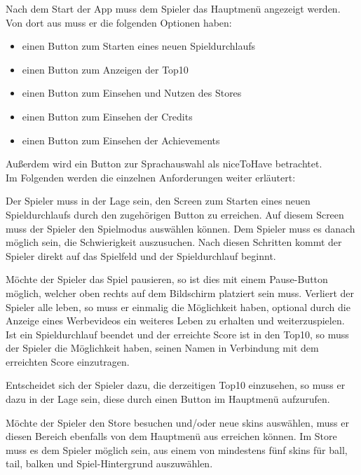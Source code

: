 Nach dem Start der App \gls{muss} dem Spieler das Hauptmenü angezeigt werden.
Von dort aus \gls{muss} er die folgenden Optionen haben:
\begin{itemize}
    \item einen Button zum Starten eines neuen Spieldurchlaufs
    \item einen Button zum Anzeigen der \gls{Top10}
    \item einen Button zum Einsehen und Nutzen des Stores
    \item einen Button zum Einsehen der Credits
    \item einen Button zum Einsehen der Achievements\OPT{*}
\end{itemize}

Außerdem wird ein Button zur Sprachauswahl als \gls{niceToHave} betrachtet.\\

Im Folgenden werden die einzelnen Anforderungen weiter erläutert:

Der Spieler \gls{muss} in der Lage sein, den Screen zum Starten eines neuen Spiel\-durchlaufs durch den zugehörigen Button zu erreichen. Auf diesem
Screen \gls{muss} der Spieler den Spielmodus auswählen können. Dem Spieler \gls{muss} es danach möglich sein, die Schwierigkeit auszusuchen.
Nach diesen Schritten kommt der Spieler direkt auf das Spielfeld und der Spieldurchlauf beginnt.

Möchte der Spieler das Spiel pausieren, so ist dies mit einem Pause-Button möglich, welcher oben rechts auf dem Bildschirm platziert sein \gls{muss}.
Verliert der Spieler alle \gls{leben}, so \gls{muss} er einmalig die Möglichkeit haben, optional durch die Anzeige eines Werbevideos ein weiteres Leben zu erhalten und weiterzuspielen.
Ist ein Spieldurchlauf beendet und der erreichte Score ist in den \gls{Top10}, so \gls{muss} der Spieler die Möglichkeit haben, seinen Namen in Verbindung mit dem erreichten Score einzutragen.

Entscheidet sich der Spieler dazu, die derzeitigen \gls{Top10} einzusehen, so \gls{muss} er dazu in der Lage sein, diese durch einen Button im Hauptmenü aufzurufen.

Möchte der Spieler den Store besuchen und/oder neue \glspl{skin} auswählen, \gls{muss} er diesen Bereich ebenfalls von dem Hauptmenü aus erreichen können. 
Im Store \gls{muss} es dem Spieler möglich sein, aus einem von mindestens fünf \glspl{skin} für \gls{ball}, \gls{tail}, \gls{balken} und Spiel-Hintergrund auszuwählen.

